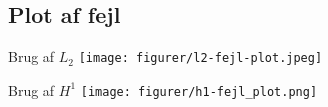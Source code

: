 \subsection{Plot af fejl}
\begin{frame}{Brug af $L_2$}
\texttt{[image: figurer/l2-fejl-plot.jpeg]}    
\end{frame}
\begin{frame}{Brug af $H^1$}
   \texttt{[image: figurer/h1-fejl\_plot.png]} 
\end{frame}